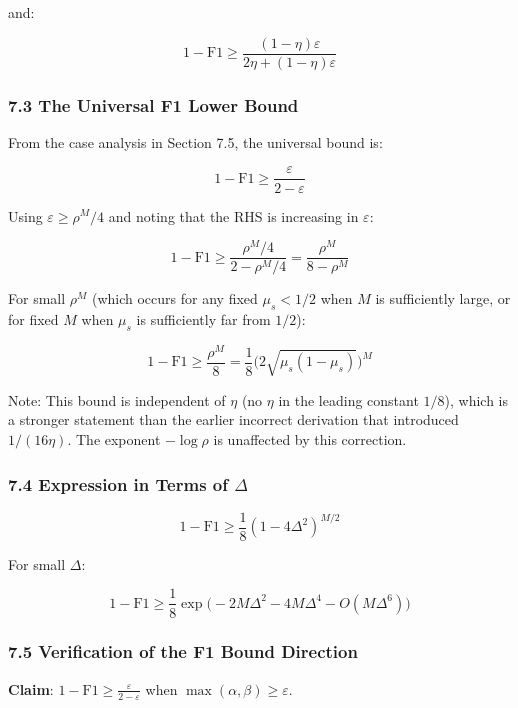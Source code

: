 \documentclass[
  12pt,
]{article}
\begin{document}
and:

\[1 - \text{F1} \geq \frac{(1-\eta)\varepsilon}{2\eta + (1-\eta)\varepsilon}\]

\subsubsection{7.3 The Universal F1 Lower
Bound}\label{the-universal-f1-lower-bound}

From the case analysis in Section 7.5, the universal bound is:

\[1 - \text{F1} \geq \frac{\varepsilon}{2-\varepsilon}\]

Using \(\varepsilon \geq \rho^M/4\) and noting that the RHS is
increasing in \(\varepsilon\):

\[1 - \text{F1} \geq \frac{\rho^M/4}{2 - \rho^M/4}
= \frac{\rho^M}{8 - \rho^M}\]

For small \(\rho^M\) (which occurs for any fixed \(\mu_s < 1/2\) when
\(M\) is sufficiently large, or for fixed \(M\) when \(\mu_s\) is
sufficiently far from \(1/2\)):

\[1 - \text{F1} \geq \frac{\rho^M}{8} = \frac18 \bigl(2\sqrt{\mu_s(1-\mu_s)}\bigr)^M\]

Note: This bound is independent of \(\eta\) (no \(\eta\) in the leading
constant \(1/8\)), which is a stronger statement than the earlier
incorrect derivation that introduced \(1/(16\eta)\). The exponent
\(-\log\rho\) is unaffected by this correction.

\subsubsection{\texorpdfstring{7.4 Expression in Terms of
\(\Delta\)}{7.4 Expression in Terms of \textbackslash Delta}}\label{expression-in-terms-of-delta}

\[1 - \text{F1} \geq \frac18 (1-4\Delta^2)^{M/2}\]

For small \(\Delta\):

\[1 - \text{F1} \geq \frac18 \exp\!\bigl(-2M\Delta^2 - 4M\Delta^4 - O(M\Delta^6)\bigr)\]

\subsubsection{7.5 Verification of the F1 Bound
Direction}\label{verification-of-the-f1-bound-direction}

\textbf{Claim}: \(1 - \text{F1} \geq \frac{\varepsilon}{2-\varepsilon}\)
when \(\max(\alpha, \beta) \geq \varepsilon\).
\end{document}
